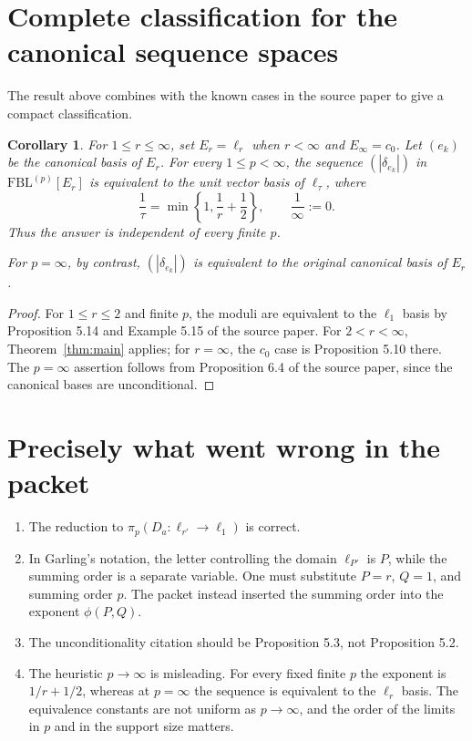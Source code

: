 \documentclass[11pt]{article}
\newtheorem{corollary}[theorem]{Corollary}
\theoremstyle{remark}
\newcommand{\FBL}{\mathrm{FBL}}
\newcommand{\abs}[1]{\left\lvert #1\right\rvert}
\begin{document}
\section{Complete classification for the canonical sequence spaces}

The result above combines with the known cases in the source paper to give
a compact classification.

\begin{corollary}
\label{cor:classification}
For $1\le r\le\infty$, set $E_r=\ell_r$ when $r<\infty$ and
$E_\infty=c_0$.  Let $(e_k)$ be the canonical basis of $E_r$.  For every
$1\le p<\infty$, the sequence $(\abs{\delta_{e_k}})$ in
$\FBL^{(p)}[E_r]$ is equivalent to the unit vector basis of $\ell_{\tau}$,
where
\[
 \frac1\tau=\min\left\{1,\frac1r+\frac12\right\},
 \qquad \frac1\infty:=0.
\]
Thus the answer is independent of every finite $p$.

For $p=\infty$, by contrast, $(\abs{\delta_{e_k}})$ is equivalent to the
original canonical basis of $E_r$.
\end{corollary}

\begin{proof}
For $1\le r\le2$ and finite $p$, the moduli are equivalent to the
$\ell_1$ basis by Proposition 5.14 and Example 5.15 of the source paper.
For $2<r<\infty$, Theorem~\ref{thm:main} applies; for $r=\infty$, the
$c_0$ case is Proposition 5.10 there.  The $p=\infty$ assertion follows
from Proposition 6.4 of the source paper, since the canonical bases are
unconditional.
\end{proof}

\section{Precisely what went wrong in the packet}

\begin{enumerate}[leftmargin=2em]
\item The reduction to $\pi_p(D_a:\ell_{r'}\to\ell_1)$ is correct.
\item In Garling's notation, the letter controlling the domain
      $\ell_{P'}$ is $P$, while the summing order is a separate variable.
      One must substitute $P=r$, $Q=1$, and summing order $p$.  The packet
      instead inserted the summing order into the exponent
      $\phi(P,Q)$.
\item The unconditionality citation should be Proposition 5.3, not
      Proposition 5.2.
\item The heuristic $p\to\infty$ is misleading.  For every fixed finite
      $p$ the exponent is $1/r+1/2$, whereas at $p=\infty$ the sequence is
      equivalent to the $\ell_r$ basis.  The equivalence constants are not
      uniform as $p\to\infty$, and the order of the limits in $p$ and in
      the support size matters.
\end{enumerate}
\end{document}
